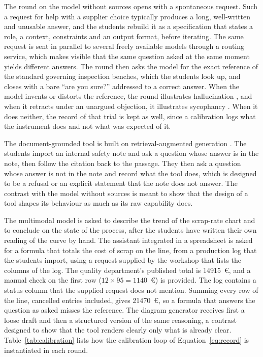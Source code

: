\documentclass[11pt,a4paper]{article}
\begin{document}
The round on the model without sources opens with a spontaneous request. Such a request for help with a
supplier choice typically produces a long, well-written and unusable answer, and the students rebuild it
as a specification that states a role, a context, constraints and an output format, before
iterating. The same request is sent in parallel to several freely available models through a
routing service, which makes visible that the same question asked at the same moment yields
different answers. The round then asks the model for the exact reference of the standard
governing inspection benches, which the students look up, and closes with a bare ``are you
sure?'' addressed to a correct answer. When the model invents or distorts the reference, the
round illustrates hallucination \cite{ji2023}, and when it retracts under an unargued
objection, it illustrates sycophancy \cite{sharma2024}. When it does neither, the record of
that trial is kept as well, since a calibration logs what the instrument does and not what was
expected of it.

The document-grounded tool is built on retrieval-augmented generation \cite{lewis2020}. The
students import an internal safety note and ask a question whose answer is in the note, then
follow the citation back to the passage. They then ask a question whose answer is not in the
note and record what the tool does, which is designed to be a refusal or an explicit statement
that the note does not answer. The contrast with the model without sources is meant to show
that the design of a tool shapes its behaviour as much as its raw capability does.

The multimodal model is asked to describe the trend of the scrap-rate chart and to conclude on
the state of the process, after the students have written their own reading of the curve by
hand. The assistant integrated in a spreadsheet is asked for a formula that totals the cost of
scrap on the line, from a production log that the students import, using a request supplied by
the workshop that lists the columns of the log. The
quality department's published total is \num{14915}~\euro{}, and a manual check on the first
row ($12 \times 95 = \num{1140}$~\euro{}) is provided. The log contains a status column that the
supplied request does not mention. Summing every row of the line, cancelled entries included,
gives \num{21470}~\euro{}, so a formula that answers the question as asked misses the reference.
The diagram generator receives first a loose draft and then a structured version of the same
reasoning, a contrast designed to show that the tool renders clearly only what is already
clear. Table~\ref{tab:calibration} lists how the calibration loop of
Equation~\eqref{eq:record} is instantiated in each round.
\end{document}
